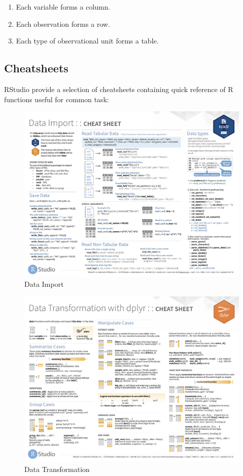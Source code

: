 \documentclass[]{book}
\providecommand{\tightlist}{%
  \setlength{\itemsep}{0pt}\setlength{\parskip}{0pt}}
\theoremstyle{definition}
\theoremstyle{definition}
\theoremstyle{definition}
\theoremstyle{remark}
\begin{document}
\begin{enumerate}
\def\labelenumi{\arabic{enumi}.}
\tightlist
\item
  Each variable forms a column.
\item
  Each observation forms a row.
\item
  Each type of observational unit forms a table.
\end{enumerate}

\subsection{Cheatsheets}\label{cheatsheets}

RStudio provide a selection of cheatsheets containing quick reference of
R functions useful for common task:

\begin{figure}

{\centering \includegraphics[width=0.8\linewidth]{images/data-import-cheatsheet-1} 

}

\caption{Data Import}\label{fig:data-import-cheatsheet}
\end{figure}

\begin{figure}

{\centering \includegraphics[width=0.8\linewidth]{images/data-transformation-cheatsheet} 

}

\caption{Data Transformation}\label{fig:data-transformation-cheatsheet}
\end{figure}
\end{document}
